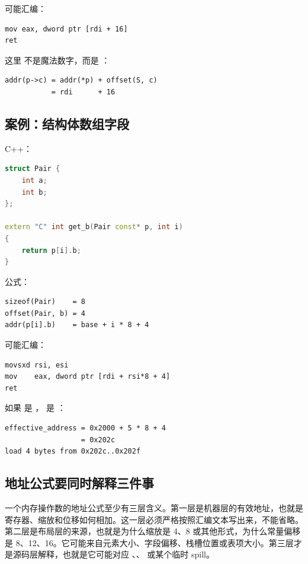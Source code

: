 可能汇编：

\begin{lstlisting}
mov eax, dword ptr [rdi + 16]
ret
\end{lstlisting}

这里  不是魔法数字，而是 ：

\begin{lstlisting}
addr(p->c) = addr(*p) + offset(S, c)
           = rdi      + 16
\end{lstlisting}

\subsection{案例：结构体数组字段}

C++：

\begin{lstlisting}[language=C++]
struct Pair {
    int a;
    int b;
};

extern "C" int get_b(Pair const* p, int i)
{
    return p[i].b;
}
\end{lstlisting}

公式：

\begin{lstlisting}
sizeof(Pair)    = 8
offset(Pair, b) = 4
addr(p[i].b)    = base + i * 8 + 4
\end{lstlisting}

可能汇编：

\begin{lstlisting}
movsxd rsi, esi
mov    eax, dword ptr [rdi + rsi*8 + 4]
ret
\end{lstlisting}

如果  是 ， 是 ：

\begin{lstlisting}
effective_address = 0x2000 + 5 * 8 + 4
                  = 0x202c
load 4 bytes from 0x202c..0x202f
\end{lstlisting}

\subsection{地址公式要同时解释三件事}

一个内存操作数的地址公式至少有三层含义。第一层是机器层的有效地址，也就是寄存器、缩放和位移如何相加。这一层必须严格按照汇编文本写出来，不能省略。第二层是布局层的来源，也就是为什么缩放是 4、8 或其他形式，为什么常量偏移是 8、12、16。它可能来自元素大小、字段偏移、栈槽位置或表项大小。第三层才是源码层解释，也就是它可能对应 、、 或某个临时 spill。

